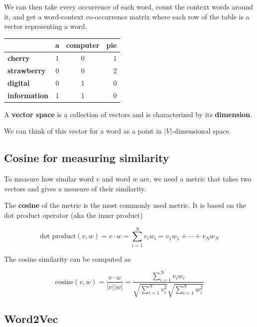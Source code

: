\documentclass[11pt]{article}
\begin{document}
We can then take every occurrence of each word, count the context
words around it, and get a word-context co-occurrence matrix where each row of
the table is a vector representing a word.

\begin{center}
	\begin{tabular}{lccr}
		                     & \textbf{a} & \textbf{computer} & \textbf{pie} \\
		\hline
		\textbf{cherry}      & 1          & 0                 & 1            \\
		\textbf{strawberry}  & 0          & 0                 & 2            \\
		\textbf{digital}     & 0          & 1                 & 0            \\
		\textbf{information} & 1          & 1                 & 0
	\end{tabular}
\end{center}

A \textbf{vector space} is a collection of vectors and is characterized by its
\textbf{dimension}.

We can think of this vector for a word as a point in $|V|$-dimensional space.

\subsection{Cosine for measuring similarity}

To measure how similar word $v$ and word $w$ are, we need a metric that takes
two vectors and gives a measure of their similarity.

The \textbf{cosine} of the metric is the most commonly used metric. It is based
on the dot product operator (aka the inner product)

\begin{equation*}
	\text{dot product}(v,w) = v \cdot w = \sum_{i=1}^N v_iw_i = v_1w_1 + \cdots + v_Nw_N
\end{equation*}

The cosine similarity can be computed as

\begin{equation*}
	\text{cosine}(v,w) = \frac{v \cdot w}{|v||w|} = \frac{\sum_{i=1}^Nv_iw_i}{\sqrt{\sum_{i=1}^N v^2_i}\sqrt{\sum_{i=1}^Nw^2_i}}
\end{equation*}

\subsection{Word2Vec}
\end{document}
